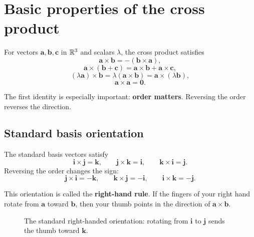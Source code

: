 \section{Basic properties of the cross product}

For vectors $\mathbf a,\mathbf b,\mathbf c$ in $\mathbb{R}^3$ and scalars $\lambda$, the cross product satisfies
\[
\mathbf a\times\mathbf b=-(\mathbf b\times\mathbf a),
\]
\[
\mathbf a\times(\mathbf b+\mathbf c)=\mathbf a\times\mathbf b+\mathbf a\times\mathbf c,
\]
\[
(\lambda\mathbf a)\times\mathbf b=\lambda(\mathbf a\times\mathbf b)=\mathbf a\times(\lambda\mathbf b),
\]
\[
\mathbf a\times\mathbf a=\mathbf 0.
\]

The first identity is especially important: \textbf{order matters}. Reversing the order reverses the direction.

\subsection{Standard basis orientation}

The standard basis vectors satisfy
\[
\mathbf i\times\mathbf j=\mathbf k,
\qquad
\mathbf j\times\mathbf k=\mathbf i,
\qquad
\mathbf k\times\mathbf i=\mathbf j.
\]
Reversing the order changes the sign:
\[
\mathbf j\times\mathbf i=-\mathbf k,
\qquad
\mathbf k\times\mathbf j=-\mathbf i,
\qquad
\mathbf i\times\mathbf k=-\mathbf j.
\]

This orientation is called the \textbf{right-hand rule}. If the fingers of your right hand rotate from $\mathbf a$ toward $\mathbf b$, then your thumb points in the direction of $\mathbf a\times\mathbf b$.

\begin{figure}[H]
\centering
{}
\caption{The standard right-handed orientation: rotating from $\mathbf i$ to $\mathbf j$ sends the thumb toward $\mathbf k$.}
\label{fig:right-hand-rule}
\end{figure}

